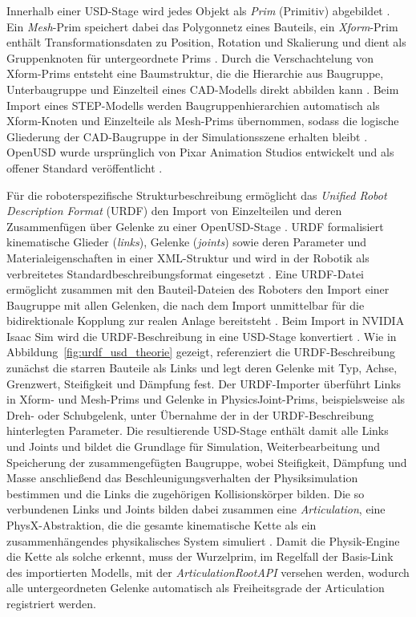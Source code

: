 Innerhalb einer USD-Stage wird jedes Objekt als \emph{Prim} (Primitiv) abgebildet \cite{pixar_openusd}.
Ein \emph{Mesh}-Prim speichert dabei das Polygonnetz eines Bauteils, ein \emph{Xform}-Prim enthält Transformationsdaten zu Position, Rotation und Skalierung und dient als Gruppenknoten für untergeordnete Prims \cite{pixar_openusd}.
Durch die Verschachtelung von Xform-Prims entsteht eine Baumstruktur, die die Hierarchie aus Baugruppe, Unterbaugruppe und Einzelteil eines CAD-Modells direkt abbilden kann \cite{pixar_openusd}.
Beim Import eines STEP-Modells werden Baugruppenhierarchien automatisch als Xform-Knoten und Einzelteile als Mesh-Prims übernommen, sodass die logische Gliederung der CAD-Baugruppe in der Simulationsszene erhalten bleibt \cite{nvidia_isaacsim}.
OpenUSD wurde ursprünglich von Pixar Animation Studios entwickelt und als offener Standard veröffentlicht \cite{pixar_openusd}.

Für die roboterspezifische Strukturbeschreibung ermöglicht das \emph{Unified Robot
Description Format} (URDF) den Import von Einzelteilen und deren Zusammenfügen über
Gelenke zu einer OpenUSD-Stage \cite{ros_urdf}.
URDF formalisiert kinematische Glieder (\emph{links}), Gelenke (\emph{joints}) sowie deren Parameter und Materialeigenschaften in einer XML-Struktur und wird in der Robotik als verbreitetes Standardbeschreibungsformat eingesetzt \cite{ros_urdf}.
Eine URDF-Datei ermöglicht zusammen mit den Bauteil-Dateien des Roboters den Import einer Baugruppe mit allen Gelenken, die nach dem Import unmittelbar für die bidirektionale Kopplung zur realen Anlage bereitsteht \cite{ros_urdf}.
Beim Import in NVIDIA Isaac Sim wird die URDF-Beschreibung in eine USD-Stage konvertiert \cite{nvidia_isaacsim}.
Wie in Abbildung~\ref{fig:urdf_usd_theorie} gezeigt, referenziert die URDF-Beschreibung zunächst die starren Bauteile als Links und legt deren Gelenke mit Typ, Achse, Grenzwert, Steifigkeit und Dämpfung fest.
Der URDF-Importer überführt Links in Xform- und Mesh-Prims und Gelenke in PhysicsJoint-Prims, beispielsweise als Dreh- oder Schubgelenk, unter Übernahme der in der URDF-Beschreibung hinterlegten Parameter.
Die resultierende USD-Stage enthält damit alle Links und Joints und bildet die Grundlage für Simulation, Weiterbearbeitung und Speicherung der zusammengefügten Baugruppe, wobei Steifigkeit, Dämpfung und Masse anschließend das Beschleunigungsverhalten der Physiksimulation bestimmen und die Links die zugehörigen Kollisionskörper bilden.
Die so verbundenen Links und Joints bilden dabei zusammen eine \emph{Articulation}, eine PhysX-Abstraktion, die die gesamte kinematische Kette als ein zusammenhängendes physikalisches System simuliert \cite{nvidia_physx}.
Damit die Physik-Engine die Kette als solche erkennt, muss der Wurzelprim, im Regelfall der Basis-Link des importierten Modells, mit der \emph{ArticulationRootAPI} versehen werden, wodurch alle untergeordneten Gelenke automatisch als Freiheitsgrade der Articulation registriert werden.

